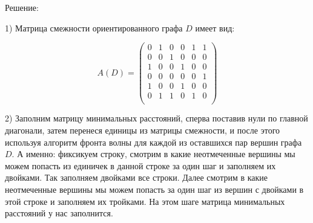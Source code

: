 \documentclass[fleqn]{article}
\begin{document}

\begin{center}Решение:\end{center}

1) Матрица смежности ориентированного графа $D$ имеет вид:

$$A(D)=
\begin{pmatrix}
0 & 1 & 0 & 0 & 1 & 1 \\
0 & 0 & 1 & 0 & 0 & 0 \\
1 & 0 & 0 & 1 & 0 & 0 \\
0 & 0 & 0 & 0 & 0 & 1 \\
1 & 0 & 0 & 1 & 0 & 0 \\
0 & 1 & 1 & 0 & 1 & 0 \\
\end{pmatrix}
$$

2) Заполним матрицу минимальных расстояний, сперва поставив нули по главной диагонали, затем перенеся единицы из матрицы смежности, и после этого используя алгоритм фронта волны для каждой из оставшихся пар вершин графа $D$. А именно: фиксикуем строку, смотрим в какие неотмеченные вершины мы можем попасть из единичек в данной строке за один шаг и заполняем их двойками. Так заполняем двойками все строки. Далее смотрим в какие неотмеченные вершины мы можем попасть за один шаг из вершин с двойками в этой строке и заполняем их тройками. На этом шаге матрица минимальных расстояний у нас заполнится.
\end{document}
